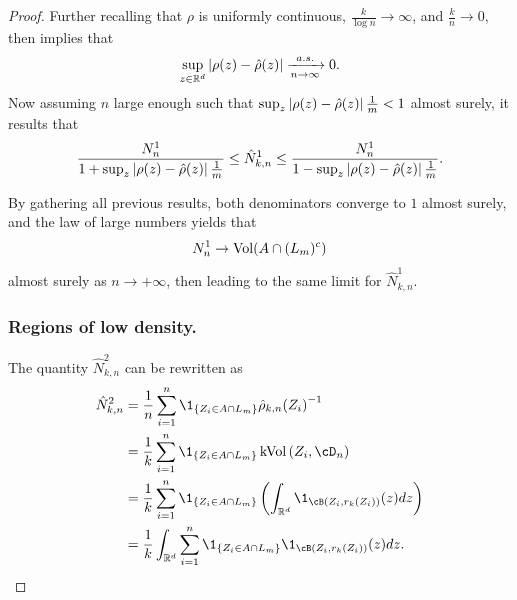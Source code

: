 \documentclass[twoside]{article}
\DeclareMathOperator{\kvol}{kVol}
\theoremstyle{definition}
\theoremstyle{remark}
\newcommand{\kvv}{z} %
\newcommand{\KVV}{Z} %
\begin{document}
\begin{proof}
Further recalling that $\rho$ is uniformly continuous, $\frac{k}{\log n} \to \infty$, and $\frac{k}{n} \to 0$, then \citet[Theorem 4.2]{biauLecturesNearestNeighbor2015} implies that
\[
    \sup_{\kvv\in\R^d} \abs{\rho(\kvv) - \hat{\rho}(\kvv)} \xra[a.s.]{n\to\infty} 0.
\] 
%
Now assuming $n$ large enough such that $\sup_\kvv \abs{\rho(\kvv)-\hat{\rho}(\kvv)} \frac{1}{m} < 1$ almost surely, it results that
\begin{align} \label{eq.sandwich.inequality}
    \frac{N_n^1}{1 + \sup_\kvv \abs{\rho(\kvv)-\hat{\rho}(\kvv)} \frac{1}{m}} \leq \hat{N}_{k,n}^1 \leq \frac{N_n^1}{1 - \sup_\kvv \abs{\rho(\kvv)-\hat{\rho}(\kvv)} \frac{1}{m}} .
\end{align}    


By gathering all previous results, both denominators converge to $1$ almost surely, and the law of large numbers yields that 
\begin{align}\label{eq.N1.almost.sure}
    N_n^1\to \operatorname{Vol}(A\cap (L_m)^c)
\end{align} almost surely as $n\to +\infty$, then leading to the same limit for $\hat{N}_{k,n}^1$. 
%















\subsubsection*{Regions of low density.}
%
The quantity $\hat{N}_{k,n}^2$ can be rewritten as
\begin{align*}
    \hat{N}_{k,n}^2  &=  \frac{1}{n} \sum_{i=1}^n\1_{\set{\KVV_i\in A\cap L_m}}{\hat{\rho}_{k,n}(\KVV_i)}^{-1} \\
    &= \frac{1}{k} \sum_{i=1}^n \1_{\set{\KVV_i\in  A\cap L_m}} \kvol\pa{\KVV_i,\cD_n} \\
    &= \frac{1}{k} \sum_{i=1}^n \1_{\set{\KVV_i\in  A\cap L_m}}  \pa{\int_{\R^d}\1_{\cB\pa{\KVV_i,r_k(\KVV_i)}}(\kvv) d \kvv} \\ 
    &= \frac{1}{k} \int_{\R^d} \sum_{i=1}^n \1_{\set{\KVV_i\in  A\cap L_m}}  \1_{\cB\pa{\KVV_i,r_k(\KVV_i)}}(\kvv) d \kvv.
\end{align*}
%


\end{proof}
\end{document}
